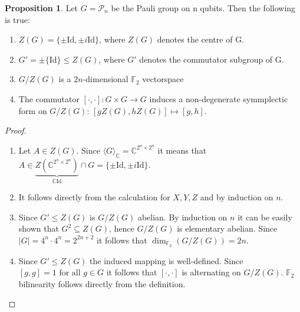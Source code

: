 \documentclass{article}
\def\P{\mathcal{P}}
\def\F{\mathbb{F}}
\def\C{\mathbb{C}}
\def\fa{\text{ for all }}
\def\Id{\text{Id}}
\theoremstyle{definition}
\newtheorem{prop}[Satz]{Proposition}
\begin{document}
\begin{prop} Let $G = \P_n$ be the Pauli group on n qubits. Then the following is true:
\begin{enumerate}
\item $Z(G) = \{ \pm \Id, \pm i \Id \}$, where $Z(G)$ denotes the centre of G.
\item $G' = \pm \{ \Id \} \leq Z(G)$, where $G'$ denotes the commutator subgroup of G.
\item $G/Z(G)$ is a $2n$-dimensional $\F_2$ vectorspace
\item The commutator $[\cdot,\cdot] : G \times G \rightarrow G$ induces a non-degenerate symmplectic form on $G/Z(G)$: $[gZ(G),hZ(G)] \mapsto [g,h]$. 
\end{enumerate}

\begin{proof}\label{pauliprops}
\begin{enumerate}
\item Let $A \in Z(G)$. Since $\langle G \rangle_\C = \C^{2^n \times 2^n}$ it means that $A \in \underbrace{Z(\C^{2^n \times 2^n})}_{ \C \Id} \cap G = \{ \pm \Id, \pm i \Id \}$.
\item It follows directly from the calculation for $X,Y,Z$ and by induction on $n$.
\item Since $G' \leq Z(G)$ is $G/Z(G)$ abelian. By induction on $n$ it can be easily shown that $G^2 \subseteq Z(G)$, hence $G/Z(G)$ is elementary abelian. Since $|G| = 4^n \cdot 4^n = 2^{2n+2}$ it follows that $\dim_{\F_2}(G/Z(G)) = 2n$.
\item Since $G' \leq Z(G)$ the induced mapping is well-defined. Since $[g,g] = 1 \fa g \in G$ it follows that $[\cdot,\cdot]$ is alternating on $G/Z(G)$. $\F_2$ bilinearity follows directly from the definition.
\end{enumerate}
\end{proof}
\end{prop}
\end{document}
